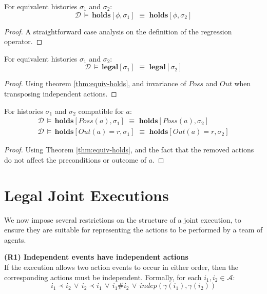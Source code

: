\begin{thm}
\label{thm:equiv-holds}For equivalent histories $\sigma_{1}$ and
$\sigma_{2}$:\[
\mathcal{D}\,\models\,\mathbf{holds}[\phi,\sigma_{1}]\,\,\equiv\,\,\mathbf{holds}[\phi,\sigma_{2}]\]

\end{thm}
\begin{proof}
A straightforward case analysis on the definition of the regression
operator.
\end{proof}
\begin{thm}
\label{thm:equiv-legal}For equivalent histories $\sigma_{1}$ and
$\sigma_{2}$:\[
\mathcal{D}\,\models\,\mathbf{legal}[\sigma_{1}]\,\,\equiv\,\,\mathbf{legal}[\sigma_{2}]\]

\end{thm}
\begin{proof}
Using theorem \ref{thm:equiv-holds}, and invariance of $Poss$ and
$Out$ when transposing independent actions.
\end{proof}
\begin{thm}
\label{thm:equiv-compat}For histories $\sigma_{1}$ and $\sigma_{2}$
compatible for $a$:\begin{gather*}
\mathcal{D}\,\models\,\mathbf{holds}[Poss(a),\sigma_{1}]\,\,\equiv\,\,\mathbf{holds}[Poss(a),\sigma_{2}]\\
\mathcal{D}\,\models\,\mathbf{holds}[Out(a)=r,\sigma_{1}]\,\,\equiv\,\,\mathbf{holds}[Out(a)=r,\sigma_{2}]\end{gather*}

\end{thm}
\begin{proof}
Using Theorem \ref{thm:equiv-holds}, and the fact that the removed
actions do not affect the preconditions or outcome of $a$.
\end{proof}

\section{Legal Joint Executions\label{sec:JointExec:Legal}}

We now impose several restrictions on the structure of a joint execution,
to ensure they are suitable for representing the actions to be performed
by a team of agents. 

\textbf{(R1) Independent events have independent actions}\\
If the execution allows two action events to occur in either order,
then the corresponding actions must be independent. Formally, for
each $i_{1},i_{2}\in\mathcal{A}$:\[
i_{1}\prec i_{2}\,\vee\, i_{2}\prec i_{1}\,\vee\, i_{1}\#i_{2}\,\vee\, indep(\gamma(i_{1}),\gamma(i_{2}))\]


